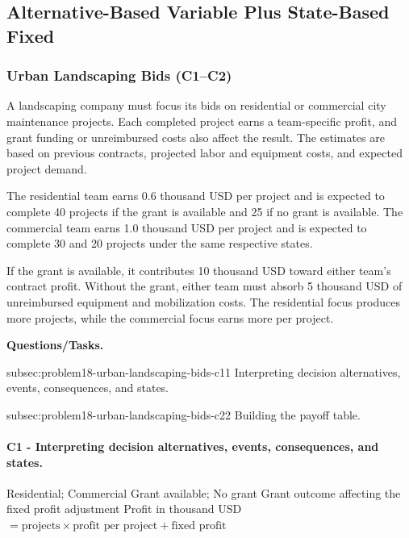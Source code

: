 	
	\subsection{Alternative-Based Variable Plus State-Based Fixed}
	\label{sec:alternative-based-variable-payoff-plus-state-based-fixed-payoff}



	\subsubsection{Urban Landscaping Bids (C1--C2)}
	\label{sec:problem18-urban-landscaping-bids-c1-c2}
	
	A landscaping company must focus its bids on residential or commercial city maintenance projects. Each completed project earns a team-specific profit, and grant funding or unreimbursed costs also affect the result. The estimates are based on previous contracts, projected labor and equipment costs, and expected project demand.
	
	The residential team earns 0.6 thousand USD per project and is expected to complete 40 projects if the grant is available and 25 if no grant is available. The commercial team earns 1.0 thousand USD per project and is expected to complete 30 and 20 projects under the same respective states.
	
	If the grant is available, it contributes 10 thousand USD toward either team’s contract profit. Without the grant, either team must absorb 5 thousand USD of unreimbursed equipment and mobilization costs. The residential focus produces more projects, while the commercial focus earns more per project.

	\textbf{Questions/Tasks.}
	\begin{enumerate}
		\CriterionTask
		{subsec:problem18-urban-landscaping-bids-c1}{1}
		{Interpreting decision alternatives, events, consequences, and states.}

		\CriterionTask
		{subsec:problem18-urban-landscaping-bids-c2}{2}
		{Building the payoff table.}
	\end{enumerate}

\paragraph*{C1 - Interpreting decision alternatives, events, consequences, and states.}
	\label{subsec:problem18-urban-landscaping-bids-c1}
	\DecisionElementsTable
	{Residential; Commercial}
	{Grant available; No grant}
	{Grant outcome affecting the fixed profit adjustment}
	{Profit in thousand USD $= \text{projects} \times \text{profit per project} + \text{fixed profit}$}

